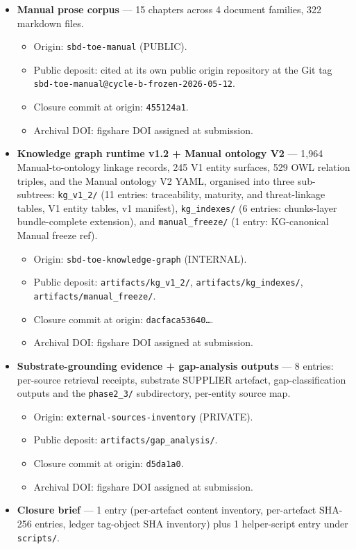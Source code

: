 \documentclass[
]{article}
\providecommand{\tightlist}{%
  \setlength{\itemsep}{0pt}\setlength{\parskip}{0pt}}
\begin{document}
\begin{itemize}
\tightlist
\item
  \textbf{Manual prose corpus} --- 15 chapters across 4 document
  families, 322 markdown files.

  \begin{itemize}
  \tightlist
  \item
    Origin: \texttt{sbd-toe-manual} (PUBLIC).
  \item
    Public deposit: cited at its own public origin repository at the Git
    tag \texttt{sbd-toe-manual@cycle-b-frozen-2026-05-12}.
  \item
    Closure commit at origin: \texttt{455124a1}.
  \item
    Archival DOI: figshare DOI assigned at submission.
  \end{itemize}
\item
  \textbf{Knowledge graph runtime v1.2 + Manual ontology V2} --- 1,964
  Manual-to-ontology linkage records, 245 V1 entity surfaces, 529 OWL
  relation triples, and the Manual ontology V2 YAML, organised into
  three sub-subtrees: \texttt{kg\_v1\_2/} (11 entries: traceability,
  maturity, and threat-linkage tables, V1 entity tables, v1 manifest),
  \texttt{kg\_indexes/} (6 entries: chunks-layer bundle-complete
  extension), and \texttt{manual\_freeze/} (1 entry: KG-canonical Manual
  freeze ref).

  \begin{itemize}
  \tightlist
  \item
    Origin: \texttt{sbd-toe-knowledge-graph} (INTERNAL).
  \item
    Public deposit: \texttt{artifacts/kg\_v1\_2/},
    \texttt{artifacts/kg\_indexes/}, \texttt{artifacts/manual\_freeze/}.
  \item
    Closure commit at origin: \texttt{dacfaca53640…}.
  \item
    Archival DOI: figshare DOI assigned at submission.
  \end{itemize}
\item
  \textbf{Substrate-grounding evidence + gap-analysis outputs} --- 8
  entries: per-source retrieval receipts, substrate SUPPLIER artefact,
  gap-classification outputs and the \texttt{phase2\_3/} subdirectory,
  per-entity source map.

  \begin{itemize}
  \tightlist
  \item
    Origin: \texttt{external-sources-inventory} (PRIVATE).
  \item
    Public deposit: \texttt{artifacts/gap\_analysis/}.
  \item
    Closure commit at origin: \texttt{d5da1a0}.
  \item
    Archival DOI: figshare DOI assigned at submission.
  \end{itemize}
\item
  \textbf{Closure brief} --- 1 entry (per-artefact content inventory,
  per-artefact SHA-256 entries, ledger tag-object SHA inventory) plus 1
  helper-script entry under \texttt{scripts/}.


\end{itemize}
\end{document}
